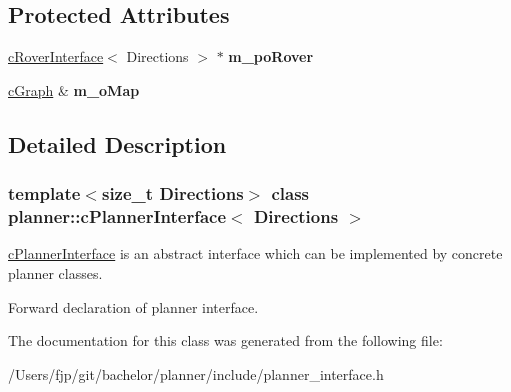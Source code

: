 \subsection*{Protected Attributes}
\begin{DoxyCompactItemize}
\item 
\mbox{\label{classplanner_1_1c_planner_interface_a1852a0026adea5745fbb6a0d24fc1d89}} 
\mbox{\hyperlink{classplanner_1_1c_rover_interface}{c\+Rover\+Interface}}$<$ Directions $>$ $\ast$ {\bfseries m\+\_\+po\+Rover}
\item 
\mbox{\label{classplanner_1_1c_planner_interface_a5879156b36e10ec8941a6d29617ca7be}} 
\mbox{\hyperlink{classplanner_1_1c_graph}{c\+Graph}} \& {\bfseries m\+\_\+o\+Map}
\end{DoxyCompactItemize}


\subsection{Detailed Description}
\subsubsection*{template$<$size\+\_\+t Directions$>$\newline
class planner\+::c\+Planner\+Interface$<$ Directions $>$}

\mbox{\hyperlink{classplanner_1_1c_planner_interface}{c\+Planner\+Interface}} is an abstract interface which can be implemented by concrete planner classes. 

Forward declaration of planner interface. 

The documentation for this class was generated from the following file\+:\begin{DoxyCompactItemize}
\item 
/\+Users/fjp/git/bachelor/planner/include/planner\+\_\+interface.\+h\end{DoxyCompactItemize}
